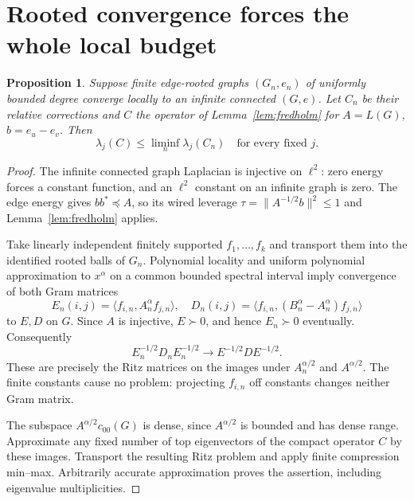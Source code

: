 \documentclass[11pt]{article}
\newtheorem{proposition}[theorem]{Proposition}
\begin{document}
\section{Rooted convergence forces the whole local budget}
\begin{proposition}\label{prop:ritz}
Suppose finite edge-rooted graphs $(G_n,e_n)$ of uniformly bounded
degree converge locally to an infinite connected $(G,e)$. Let $C_n$
be their relative corrections and $C$ the operator of
Lemma~\ref{lem:fredholm} for $A=L(G)$, $b=e_u-e_v$. Then
\[
                 \lambda_j(C)\le\liminf_n\lambda_j(C_n)
                 \quad\text{for every fixed }j.
\]
\end{proposition}
\begin{proof}
The infinite connected graph Laplacian is injective on $\ell^2$:
zero energy forces a constant function, and an $\ell^2$ constant on
an infinite graph is zero. The edge energy gives $bb^*\preceq A$,
so its wired leverage $\tau=\|A^{-1/2}b\|^2\le1$ and
Lemma~\ref{lem:fredholm} applies.

Take linearly independent finitely supported $f_1,\ldots,f_k$ and
transport them into the identified rooted balls of $G_n$. Polynomial
locality and uniform polynomial approximation to $x^\alpha$ on a
common bounded spectral interval imply convergence of both Gram
matrices
\[
 E_n(i,j)=\langle f_{i,n},A_n^\alpha f_{j,n}\rangle,
 \quad D_n(i,j)=\langle f_{i,n},(B_n^\alpha-A_n^\alpha)f_{j,n}\rangle
\]
to $E,D$ on $G$. Since $A$ is injective, $E\succ0$, and hence
$E_n\succ0$ eventually. Consequently
\[
 E_n^{-1/2}D_nE_n^{-1/2}\longrightarrow E^{-1/2}DE^{-1/2}.
\]
These are precisely the Ritz matrices on the images under
$A_n^{\alpha/2}$ and $A^{\alpha/2}$. The finite constants cause no
problem: projecting $f_{i,n}$ off constants changes neither Gram matrix.

The subspace $A^{\alpha/2}c_{00}(G)$ is dense, since $A^{\alpha/2}$
is bounded and has dense range. Approximate any fixed number of top
eigenvectors of the compact operator $C$ by these images. Transport
the resulting Ritz problem and apply finite compression min--max.
Arbitrarily accurate approximation proves the assertion, including
eigenvalue multiplicities.
\end{proof}
\end{document}
